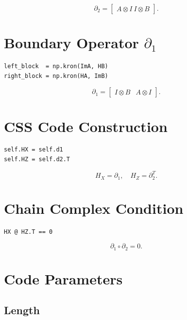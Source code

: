 \documentclass[11pt]{article}
\begin{document}
\begin{equation}
\partial_2 =
\begin{bmatrix}
A \otimes I \
I \otimes B
\end{bmatrix}.
\end{equation}

\section{Boundary Operator $\partial_1$}

\begin{verbatim}
left_block  = np.kron(ImA, HB)
right_block = np.kron(HA, ImB)
\end{verbatim}

\begin{equation}
\partial_1 =
\begin{bmatrix}
I \otimes B & A \otimes I
\end{bmatrix}.
\end{equation}

\section{CSS Code Construction}

\begin{verbatim}
self.HX = self.d1
self.HZ = self.d2.T
\end{verbatim}

\begin{equation}
H_X = \partial_1, \quad H_Z = \partial_2^T.
\end{equation}

\section{Chain Complex Condition}

\begin{verbatim}
HX @ HZ.T == 0
\end{verbatim}

\begin{equation}
\partial_1 \circ \partial_2 = 0.
\end{equation}

\section{Code Parameters}

\subsection{Length}
\end{document}

